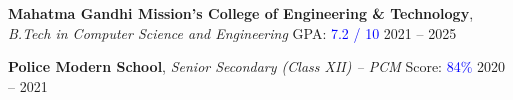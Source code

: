 




\begin{cvhonors}

     \cvhonor
    { {\bf Mahatma Gandhi Mission’s College of Engineering \& Technology}, \textit{B.Tech in Computer Science and Engineering} \hspace{11.4em} GPA: \textcolor{blue}{7.2 / 10}} %
     {\hspace{1cm}2021 -- 2025}%

  \cvhonor
    { {\bf Police Modern School}, \textit{Senior Secondary (Class XII) -- PCM} \hspace{1em} Score: \textcolor{blue}{84\%}} %
      {\hspace{1cm}2020 -- 2021} %

\end{cvhonors}
\vspace{-6pt} %


